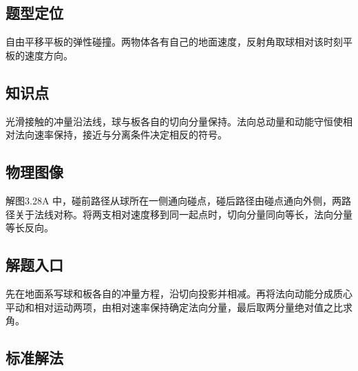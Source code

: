 \documentclass[UTF8,fontset=fandol,a4paper,11pt]{ctexart}
\begin{document}

\subsection*{题型定位}

自由平移平板的弹性碰撞。两物体各有自己的地面速度，反射角取球相对该时刻平板的速度方向。



\subsection*{知识点}

光滑接触的冲量沿法线，球与板各自的切向分量保持。法向总动量和动能守恒使相对法向速率保持，接近与分离条件决定相反的符号。




\subsection*{物理图像}

解图3.28A 中，碰前路径从球所在一侧通向碰点，碰后路径由碰点通向外侧，两路径关于法线对称。将两支相对速度移到同一起点时，切向分量同向等长，法向分量等长反向。



\subsection*{解题入口}

先在地面系写球和板各自的冲量方程，沿切向投影并相减。再将法向动能分成质心平动和相对运动两项，由相对速率保持确定法向分量，最后取两分量绝对值之比求角。



\subsection*{标准解法}
\end{document}
